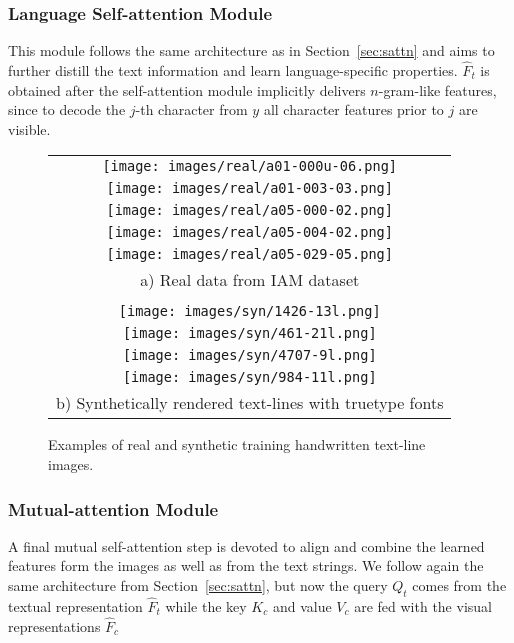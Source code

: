 \documentclass[10pt,twocolumn,letterpaper]{article}
\begin{document}
\subsubsection{Language Self-attention Module}
\label{sec:sattn_t}
This module follows the same architecture as in Section~\ref{sec:sattn} and aims to further distill the text information and learn language-specific properties. $\hat{F}_{t}$ is obtained after the self-attention module implicitly delivers $n$-gram-like features, since to decode the $j$-th character from $y$ all character features prior to $j$ are visible.

\begin{figure*}[t!h]
    \centering
    \begin{tabular}{c}
        \texttt{[image: images/real/a01-000u-06.png]}\\
         \texttt{[image: images/real/a01-003-03.png]}\\
         \texttt{[image: images/real/a05-000-02.png]}\\
         \texttt{[image: images/real/a05-004-02.png]}\\
         \texttt{[image: images/real/a05-029-05.png]}\\
         a) Real data from IAM dataset\\
         \\
\texttt{[image: images/syn/1426-13l.png]}\\
         \texttt{[image: images/syn/461-21l.png]}\\
         \texttt{[image: images/syn/4707-9l.png]}\\
         \texttt{[image: images/syn/984-11l.png]}\\
b) Synthetically rendered text-lines with truetype fonts \\
\end{tabular}
    \caption{Examples of real and synthetic training handwritten text-line images.}
    \label{fig:syn}
\end{figure*}


\subsubsection{Mutual-attention Module}
\label{sec:mattn}
A final mutual self-attention step is devoted to align and combine the learned features form the images as well as from the text strings. We follow again the same architecture from Section~\ref{sec:sattn}, but now the query $Q_t$ comes from the textual representation $\hat{F}_{t}$ while the key $K_{c}$ and value $V_{c}$ are fed with the visual representations $\hat{F}_{c}$
\end{document}
